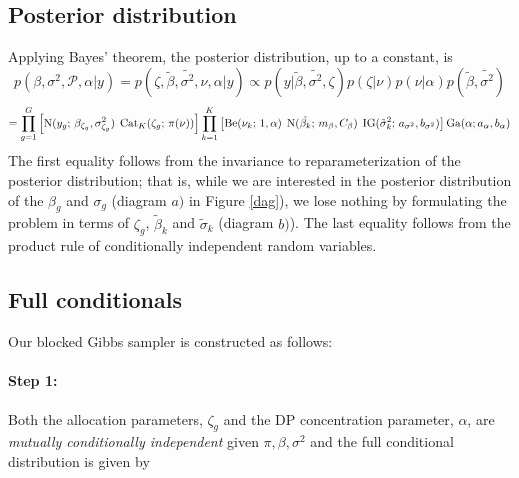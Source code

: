 {%

\subsection{Posterior distribution}
\label{subsec:posterior}


Applying Bayes' theorem, the posterior distribution, up to a constant, is
\begin{equation*}
p(\beta,\sigma^2,\mathcal{P},\alpha|y) = p(\zeta, \tilde{\beta},\tilde{\sigma^2},\nu,\alpha | y) \propto p(y|\tilde{\beta},\tilde{\sigma^2},\zeta) p(\zeta|\nu) p(\nu|\alpha)p(\tilde{\beta},\tilde{\sigma^2})
\end{equation*}
\begin{equation*}
= \prod_{g=1}^G \left[ \operatorname{N}(y_g;\,\beta_{\zeta_g},\sigma^2_{\zeta_g})\; \operatorname{Cat}_K(\zeta_g;\, \pi(\nu)) \right] \prod_{k=1}^K \left[ \operatorname{Be}(\nu_k;\, 1, \alpha)\; \operatorname{N}(\tilde{\beta_k};\,m_\beta, C_\beta)\;\operatorname{IG}(\tilde{\sigma}^2_k;\,a_{\sigma^2},b_{\sigma^2})\right] \operatorname{Ga}(\alpha;a_\alpha,b_\alpha)
\end{equation*}
The first equality follows from the  invariance to reparameterization of the posterior distribution; that is, while we are interested in the posterior distribution of the $\beta_g$ and $\sigma_g$ (diagram $a)$ in Figure \ref{dag}), we lose nothing by formulating the problem in terms of $\zeta_g$, $\tilde{\beta}_k$ and $\tilde{\sigma}_k$ (diagram $b)$). The last equality follows from the product rule of conditionally independent random variables.

\subsection{Full conditionals}
\label{subsec:full-cond}
Our blocked Gibbs sampler is constructed as follows:
\paragraph{Step 1:}
Both the allocation parameters, $\zeta_g$ and the DP concentration parameter, $\alpha$, are \textit{mutually conditionally independent} given $\pi, \beta, \sigma^2$ and the full conditional distribution is given by

}

